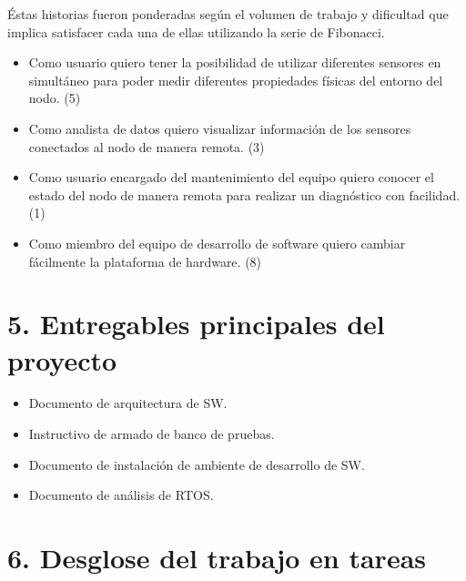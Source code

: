 \documentclass[11pt]{charter}
\begin{document}
Éstas historias fueron ponderadas según el volumen de trabajo y dificultad que implica satisfacer cada una de ellas utilizando la serie de Fibonacci.

\begin{itemize}
\item Como usuario quiero tener la posibilidad de utilizar diferentes sensores en simultáneo para poder medir diferentes propiedades físicas del entorno del nodo. (5)
\item Como analista de datos quiero visualizar información de los sensores conectados al nodo de manera remota. (3)
\item Como usuario encargado del mantenimiento del equipo quiero conocer el estado del nodo de manera remota para realizar un diagnóstico con facilidad.        (1)
\item Como miembro del equipo de desarrollo de software quiero cambiar fácilmente la plataforma de hardware. (8)
\end{itemize}

\section{5. Entregables principales del proyecto}
\label{sec:entregables}

\begin{itemize}
\item Documento de arquitectura de SW.
\item Instructivo de armado de banco de pruebas.
\item Documento de instalación de ambiente de desarrollo de SW.
\item Documento de análisis de RTOS.

\end{itemize}


\section{6. Desglose del trabajo en tareas}
\label{sec:wbs}
\end{document}
